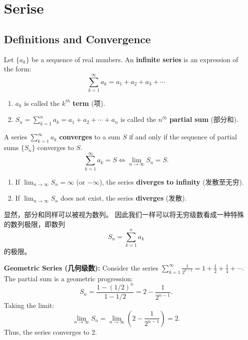 \documentclass[
	UTF-8,
	11pt, %
	a4paper, %
]{LegrandOrangeBook}
\begin{document}
    \newpage

    \section{Serise}

    \subsection{Definitions and Convergence}

    \begin{definition}
    Let $\{a_k\}$ be a sequence of real numbers. An \textbf{infinite series} is an expression of the form:
    \[ \sum_{k=1}^{\infty} a_k = a_1 + a_2 + a_3 + \cdots \]
    \begin{enumerate}
        \item $a_k$ is called the $k^{th}$ \textbf{term} (项).
        \item $S_n = \sum_{k=1}^{n} a_k = a_1 + a_2 + \cdots + a_n$ is called the $n^{th}$ \textbf{partial sum} (部分和).
    \end{enumerate}
    \end{definition}

    \begin{definition}[Convergence / 收敛]
    A series $\sum_{k=1}^{\infty} a_k$ \textbf{converges} to a sum $S$ if and only if the sequence of partial sums $\{S_n\}$ converges to $S$.
    \[ \sum_{k=1}^{\infty} a_k = S \iff \lim_{n \to \infty} S_n = S. \]
    \begin{enumerate}
        \item If $\lim_{n \to \infty} S_n = \infty$ (or $-\infty$), the series \textbf{diverges to infinity} (发散至无穷).
        \item If $\lim_{n \to \infty} S_n$ does not exist, the series \textbf{diverges} (发散).
    \end{enumerate}
    \end{definition}

    \begin{remark}
        显然，部分和同样可以被视为数列。
        因此我们一样可以将无穷级数看成一种特殊的数列极限，即数列 $$S_n = \sum_{k=1}^{n}a_k$$ 的极限。
    \end{remark}

    \begin{example}
    \textbf{Geometric Series (几何级数):}
    Consider the series $\sum_{k=1}^{\infty} \frac{1}{2^{k-1}} = 1 + \frac{1}{2} + \frac{1}{4} + \cdots$.
    The partial sum is a geometric progression:
    \[ S_n = \frac{1 - (1/2)^n}{1 - 1/2} = 2 - \frac{1}{2^{n-1}}. \]
    Taking the limit:
    \[ \lim_{n \to \infty} S_n = \lim_{n \to \infty} \left( 2 - \frac{1}{2^{n-1}} \right) = 2. \]
    Thus, the series converges to 2.
    \end{example}
\end{document}
